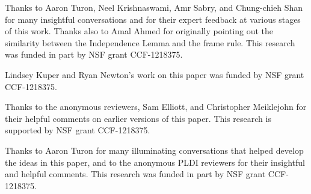 

Thanks to Aaron Turon, Neel Krishnaswami, Amr Sabry, and
Chung-chieh Shan for many insightful conversations and for their expert feedback at various stages of this work.
Thanks also to Amal Ahmed for originally pointing out the
similarity between the Independence Lemma and the frame rule.  This
research was funded in part by NSF grant CCF-1218375.




Lindsey Kuper and Ryan Newton's work on this paper was funded by NSF grant CCF-1218375.


Thanks to the anonymous reviewers, Sam Elliott, and Christopher
Meiklejohn for their helpful comments on earlier versions of this
paper.  This research is supported by NSF grant CCF-1218375.


Thanks to Aaron Turon for many illuminating conversations that helped
develop the ideas in this paper, and to the anonymous PLDI reviewers
for their insightful and helpful comments.  This research was funded
in part by NSF grant CCF-1218375.

